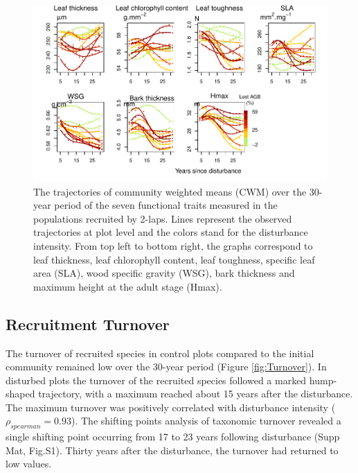 \documentclass[fleqn,10pt]{ArtEcoFoG} %
\begin{document}
\begin{figure}

{\centering \includegraphics{RecruitmentTrajectories_files/figure-latex/CWM-1} 

}

\caption{The trajectories of community weighted means (CWM) over the 30-year period of the seven functional traits measured in the populations recruited by 2-laps. Lines represent the observed trajectories at plot level and the colors stand for the disturbance intensity. From top left to bottom right, the graphs correspond to leaf thickness, leaf chlorophyll content, leaf toughness, specific leaf area (SLA), wood specific gravity (WSG), bark thickness and maximum height at the adult stage (Hmax).}\label{fig:CWM}
\end{figure}

\hypertarget{recruitment-turnover}{%
\subsection{Recruitment Turnover}\label{recruitment-turnover}}

The turnover of recruited species in control plots compared to the initial community remained low over the 30-year period (Figure \ref{fig:Turnover}).
In disturbed plots the turnover of the recruited species followed a marked hump-shaped trajectory, with a maximum reached about 15 years after the disturbance. The maximum turnover was positively correlated with disturbance intensity (\(\rho_{spearman}=0.93\)).
The shifting points analysis of taxonomic turnover revealed a single shifting point occurring from 17 to 23 years following disturbance (Supp Mat, Fig.S1).
Thirty years after the disturbance, the turnover had returned to low values.
\end{document}
